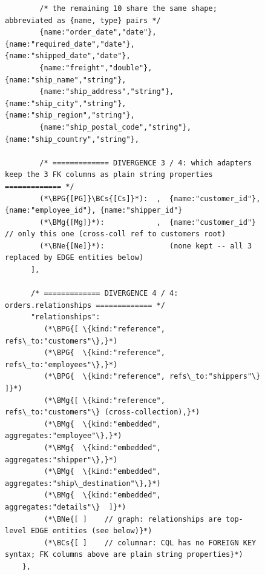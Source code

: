 \begin{figure}[htbp]
\begin{lstlisting}
        /* the remaining 10 share the same shape; abbreviated as {name, type} pairs */
        {name:"order_date","date"},      {name:"required_date","date"},   {name:"shipped_date","date"},
        {name:"freight","double"},       {name:"ship_name","string"},
        {name:"ship_address","string"},  {name:"ship_city","string"},     {name:"ship_region","string"},
        {name:"ship_postal_code","string"}, {name:"ship_country","string"},

        /* ============= DIVERGENCE 3 / 4: which adapters keep the 3 FK columns as plain string properties ============= */
        (*\BPG{[PG]}\BCs{[Cs]}*):  ,  {name:"customer_id"}, {name:"employee_id"}, {name:"shipper_id"}
        (*\BMg{[Mg]}*):            ,  {name:"customer_id"}     // only this one (cross-coll ref to customers root)
        (*\BNe{[Ne]}*):               (none kept -- all 3 replaced by EDGE entities below)
      ],

      /* ============= DIVERGENCE 4 / 4: orders.relationships ============= */
      "relationships":
         (*\BPG{[ \{kind:"reference", refs\_to:"customers"\},}*)
         (*\BPG{  \{kind:"reference", refs\_to:"employees"\},}*)
         (*\BPG{  \{kind:"reference", refs\_to:"shippers"\}  ]}*)
         (*\BMg{[ \{kind:"reference", refs\_to:"customers"\} (cross-collection),}*)
         (*\BMg{  \{kind:"embedded",  aggregates:"employee"\},}*)
         (*\BMg{  \{kind:"embedded",  aggregates:"shipper"\},}*)
         (*\BMg{  \{kind:"embedded",  aggregates:"ship\_destination"\},}*)
         (*\BMg{  \{kind:"embedded",  aggregates:"details"\}  ]}*)
         (*\BNe{[ ]    // graph: relationships are top-level EDGE entities (see below)}*)
         (*\BCs{[ ]    // columnar: CQL has no FOREIGN KEY syntax; FK columns above are plain string properties}*)
    },


\end{lstlisting}
\end{figure}
